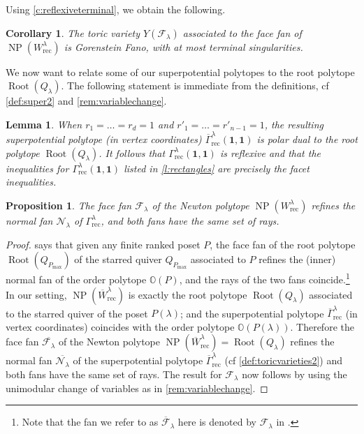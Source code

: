 \documentclass{amsart}
\newtheorem{corollary}[thm]{Corollary}
\newtheorem{lemma}[thm]{Lemma}
\newtheorem{prop}[thm]{Proposition}
\theoremstyle{definition}
\numberwithin{equation}{section}
\newcommand{\FF}{\mathcal{F}}
\newcommand{\CC}{\mathcal{N}}
\newcommand{\rect}{\mathrm{rec}}
\newcommand{\OO}{\mathbb{O}}
\newcommand{\NP}{\operatorname{NP}}
\newcommand{\Root}{\operatorname{Root}}
\newcommand{\rW}{\overline{W}}
\newcommand{\rGamma}{\overline{\Gamma}}
\begin{document}
 Using \cref{c:reflexiveterminal}, we obtain the following.
\begin{corollary}\label{thm:Gorenstein}
The toric variety $Y(\FF_\lambda)$ associated to the face fan 
of $\NP(W_{\rect}^{\lambda})$ is Gorenstein Fano,
with at most terminal singularities.
\end{corollary}



We now want to relate some of our superpotential polytopes to the root polytope $\Root(Q_\lambda)$.
The following statement is immediate from the definitions, cf \cref{def:super2} and \cref{rem:variablechange}.
\begin{lemma}\label{l:easyreflexive}
When $r_1=\dots=r_d=1$ and $r'_1=\dots=r'_{n-1}=1$, the resulting 
superpotential polytope (in vertex coordinates)
	$\rGamma_{\rect}^{\lambda}(\mathbf{1},\mathbf{1})$ 
	is polar dual to the root polytope $\Root(Q_\lambda)$.
It follows that
$\Gamma_{\rect}^{\lambda}(\mathbf{1},\mathbf{1})$  is reflexive and that the inequalities for 
$\Gamma_{\rect}^{\lambda}(\mathbf{1},\mathbf{1})$ listed in \cref{l:rectangles}
are precisely the facet inequalities.
\end{lemma}








\begin{prop}\label{prop:refine}
The face fan $\FF_\lambda$
	of the Newton polytope $\NP(W^{\lambda}_\rect)$
	refines the normal fan $\CC_{\lambda}$
	of 
	$\Gamma^{\lambda}_{\rect}$, 
	and both fans have the same set of rays.
\end{prop}
\begin{proof}
\cite[Theorem D]{RWReflexive} says that given any finite ranked poset $P$,
	the face fan of the root polytope $\Root(Q_{P_{\max}})$
	of the starred quiver  $Q_{P_{\max}}$
associated to $P$ refines the (inner) normal fan of the 
	order polytope $\OO(P)$, and the rays of the two fans coincide.\footnote{Note that 
	the fan we refer to as $\overline{\FF}_{\lambda}$ here is denoted by
	$\FF_{\lambda}$ in \cite{RWReflexive}.}
	In our setting, 
$\NP(\rW_{\rect}^{\lambda})$ is exactly the root polytope
	$\Root(Q_\lambda)$ 
	associated to the starred quiver of the 
	poset $P(\lambda)$; and the superpotential polytope
	$\rGamma^{\lambda}_{\rect}$ (in vertex 
	coordinates) coincides with the order polytope
	$\OO(P(\lambda))$. 
Therefore the face fan $\overline{\FF_{\lambda}}$  of the Newton  polytope  $\NP(\rW_{\rect}^{\lambda})	=\Root(Q_\lambda)$  refines the normal fan $\overline{\CC_{\lambda}}$ of the superpotential polytope	$\rGamma^{\lambda}_{\rect}$ (cf \cref{def:toricvarieties2}) and both fans have the same set of rays. The result for $\FF_\lambda$ now follows by using the unimodular change of variables as in \cref{rem:variablechange}.
\end{proof}
	
\end{document}
